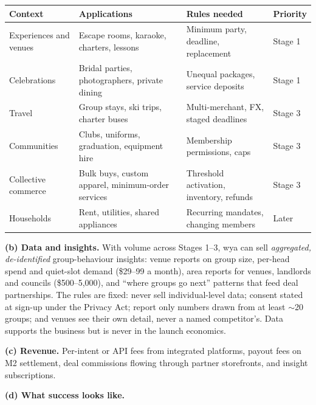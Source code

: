 \documentclass[10pt, a4paper]{report}
\begin{document}
\vspace{0.2em}
\begin{center}
\footnotesize{}
\begin{tabular}{|>{\centering\arraybackslash}p{3.2cm}|>{\raggedright\arraybackslash}p{5.6cm}|>{\raggedright\arraybackslash}p{5.4cm}|>{\centering\arraybackslash}p{2.4cm}|}
\hline
\rowcolor{hdrblue}
\textbf{Context} & \textbf{Applications} & \textbf{Rules needed} & \textbf{Priority} \\
\hline
Experiences and venues & Escape rooms, karaoke, charters, lessons & Minimum party, deadline, replacement & \cellcolor{passgreen}Stage 1 \\
\hline
Celebrations & Bridal parties, photographers, private dining & Unequal packages, service deposits & \cellcolor{passgreen}Stage 1 \\
\hline
Travel & Group stays, ski trips, charter buses & Multi-merchant, FX, staged deadlines & Stage 3 \\
\hline
Communities & Clubs, uniforms, graduation, equipment hire & Membership permissions, caps & Stage 3 \\
\hline
Collective commerce & Bulk buys, custom apparel, minimum-order services & Threshold activation, inventory, refunds & Stage 3 \\
\hline
Households & Rent, utilities, shared appliances & Recurring mandates, changing members & Later \\
\hline
\end{tabular}
\end{center}
\normalsize

\textbf{(b) Data and insights.} With volume across Stages 1--3, wya can sell \emph{aggregated, de-identified} group-behaviour insights: venue reports on group size, per-head spend and quiet-slot demand (\$29--99 a month), area reports for venues, landlords and councils (\$500--5{,}000), and ``where groups go next'' patterns that feed deal partnerships. The rules are fixed: never sell individual-level data; consent stated at sign-up under the Privacy Act; report only numbers drawn from at least $\sim$20 groups; and venues see their own detail, never a named competitor's. Data supports the business but is never in the launch economics.

\textbf{(c) Revenue.} Per-intent or API fees from integrated platforms, payout fees on M2 settlement, deal commissions flowing through partner storefronts, and insight subscriptions.

\textbf{(d) What success looks like.}
\end{document}
